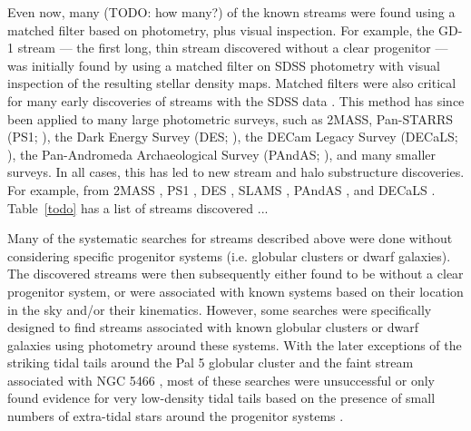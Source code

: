 \documentclass[final,5p,times,twocolumn,authoryear]{elsarticle}
\begin{document}
Even now, many (TODO: how many?) of the known streams were found using a matched filter
based on photometry, plus visual inspection.
For example, the GD-1 stream --- the first long, thin stream discovered without a clear
progenitor --- was initially found by \citet{Grillmair:2006-gd1} using a matched filter
on SDSS photometry with visual inspection of the resulting stellar density maps.
Matched filters were also critical for many early discoveries of streams with the SDSS
data \citep[e.g.,][]{Newberg:2002, Yanny:2003, Belokurov:2006, Grillmair:2006-orphan}.
This method has since been applied to many large photometric surveys, such as 2MASS,
Pan-STARRS (PS1; \citealt{chambers:2016}), the Dark Energy Survey (DES;
\citealt{des:2005, des:2016}), the DECam Legacy Survey  (DECaLS; \citealt{dey:2019}),
the Pan-Andromeda Archaeological Survey (PAndAS; \citealt{mcconnachie:2009}),
and many smaller surveys.
In all cases, this has led to new stream and halo substructure discoveries.
For example, from 2MASS \citep{rocha-pinto:2003, rocha-pinto:2004}, PS1
\citep{bernard:2014, bernard:2016, navarrete:2017}, DES \citep{shipp:2018}, SLAMS
\citep{jethwa:2018}, PAndAS \citep{martin:2014}, and DECaLS \citep{shipp:2020}.
 Table~\ref{todo} has a list of streams discovered ...

Many of the systematic searches for streams described above were done without
considering specific progenitor systems (i.e. globular clusters or dwarf galaxies).
The discovered streams were then subsequently either found to be without a clear
progenitor system, or were associated with known systems based on their location in the
sky and/or their kinematics.
However, some searches were specifically designed to find streams associated with known
globular clusters or dwarf galaxies \citep[e.g.,][]{grillmair:1995, kuhn:1996,
leon:2000} using photometry around these systems.
With the later exceptions of the striking tidal tails around the Pal 5 globular cluster
\citep{odenkirchen:2001} and the faint stream associated with NGC 5466
\citep{Grillmair:2006-ngc5466}, most of these searches were unsuccessful or only found
evidence for very low-density tidal tails based on the presence of small numbers of
extra-tidal stars around the progenitor systems \citep{grillmair:1995, leon:2000}.
\end{document}

